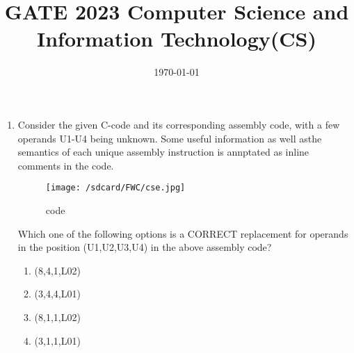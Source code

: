 \documentclass[12pt]{article}                        \usepackage{hyperref}                                \usepackage{listings}                                \usepackage{biblatex}                                \usepackage{tikz}                                    \usepackage{refstyle}                                \usepackage{mathabx}
\begin{document}
\title{\textbf{GATE 2023 Computer Science and Information Technology(CS)}}                                 \date{\today}                                        \maketitle                                           \begin{enumerate}                                    \item Consider the given C-code and its corresponding assembly code, with a few operands U1-U4 being unknown. Some useful information as well asthe semantics of each unique assembly instruction is annptated as inline comments in the code.                           \begin{figure}
\centering                              
\texttt{[image: /sdcard/FWC/cse.jpg]}        
\caption{code}                                       \label{fig:code}
\end{figure}
Which one of the following options is a CORRECT replacement for operands in the position (U1,U2,U3,U4) in the above assembly code?                             \begin{enumerate}[label=(\Alph*)]                       \item (8,4,1,L02)                                    \item (3,4,4,L01)
   \item (8,1,1,L02)                                    \item (3,1,1,L01)                                 \end{enumerate}                                      \end{enumerate}                                      
\end{document}
